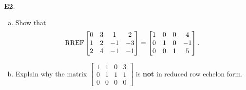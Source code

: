 \documentclass{article}
\newenvironment{problem}[1]
{
  \begin{flushleft}
  \textbf{#1}.
  \ignorespaces
}
{
  \end{flushleft}
}
\begin{document}
\begin{problem}{E2}
\begin{enumerate}[(a)]
\item Show that 
\[\operatorname{RREF} 
  \begin{bmatrix}
  0 & 3 & 1 & 2 \\
  1 & 2 & -1 & -3 \\
  2 & 4 & -1 & -1
  \end{bmatrix}
  = \begin{bmatrix}
  1 & 0 & 0 & 4 \\
  0 & {1} & 0 & -1 \\
  0 & 0 & {1} & 5
  \end{bmatrix}.
\]
\item
Explain why the matrix 
\(\begin{bmatrix}
1 & 1 & 0 & 3 \\
0 & 1 & 1 & 1 \\
0 & 0 & 0 & 0
\end{bmatrix}\)
is \textbf{not} in reduced row echelon form.
\end{enumerate}
\end{problem}
\end{document}
